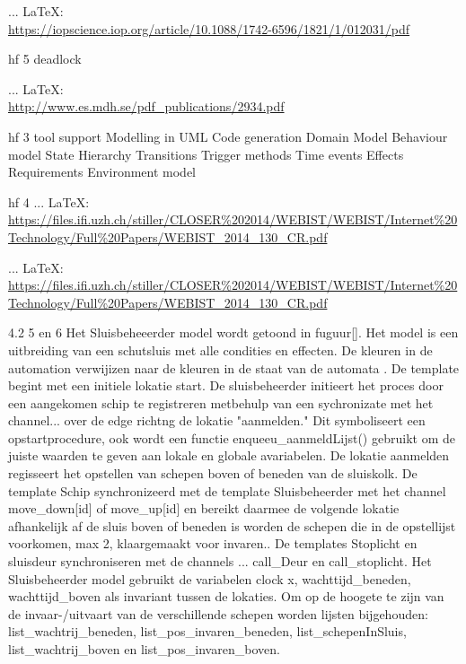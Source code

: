\begin{thebibliography}{99}
{{{{{{ ... \LaTeX:\\ \url{https://iopscience.iop.org/article/10.1088/1742-6596/1821/1/012031/pdf}

hf 5
deadlock

 ... \LaTeX:\\ \url{http://www.es.mdh.se/pdf_publications/2934.pdf}

hf 3 tool support
Modelling in UML
Code generation
Domain Model
Behaviour model
State Hierarchy
Transitions
Trigger methods
Time events
Effects
Requirements
Environment model

hf 4
 ... \LaTeX:\\ \url{https://files.ifi.uzh.ch/stiller/CLOSER%202014/WEBIST/WEBIST/Internet%20Technology/Full%20Papers/WEBIST_2014_130_CR.pdf}


 ... \LaTeX:\\ \url{https://files.ifi.uzh.ch/stiller/CLOSER%202014/WEBIST/WEBIST/Internet%20Technology/Full%20Papers/WEBIST_2014_130_CR.pdf}

4.2 5 en 6
Het Sluisbeheeerder model wordt getoond in fuguur[]. Het model is een uitbreiding van een schutsluis met alle condities en effecten. De kleuren in de automation verwijizen naar de kleuren in de staat van de automata . De template begint met een initiele lokatie start. De sluisbeheerder initieert het proces door een aangekomen schip te registreren metbehulp van een sychronizate met het channel... over de edge richtng de lokatie "aanmelden." Dit symboliseert een opstartprocedure, ook wordt een functie enqueeu_aanmeldLijst() gebruikt om de juiste waarden te geven aan lokale en globale avariabelen. De lokatie aanmelden regisseert het opstellen van schepen boven of beneden van de sluiskolk. De template Schip synchronizeerd met de template Sluisbeheerder met het channel move_down[id] of move_up[id] en bereikt daarmee de volgende lokatie afhankelijk af de sluis boven of beneden is worden de schepen die in de opstellijst voorkomen, max 2, klaargemaakt voor invaren.. De templates Stoplicht en sluisdeur synchroniseren met de channels ... call_Deur en call_stoplicht.
Het Sluisbeheerder model gebruikt de variabelen clock x, wachttijd_beneden, wachttijd_boven als invariant tussen de lokaties. Om op de hoogete te zijn van de invaar-/uitvaart van de verschillende schepen worden lijsten bijgehouden: list_wachtrij_beneden, list_pos_invaren_beneden, list_schepenInSluis, list_wachtrij_boven en list_pos_invaren_boven.

}}}}}}
\end{thebibliography}
